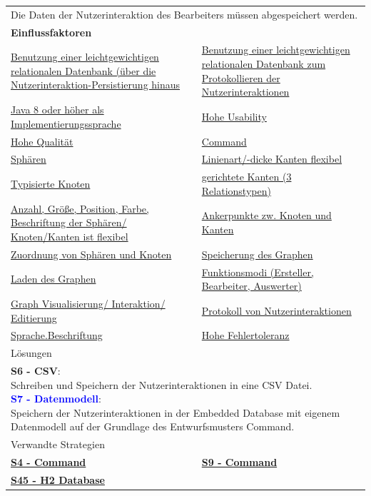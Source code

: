 \documentclass[enabledeprecatedfontcommands,fontsize=11pt,paper=a4,twoside]{scrartcl}
\newcounter{one}
\newcommand{\cb}[1]{{\textcolor{blue}{#1}}}
\begin{document}
	\newpage
	\begin{tabular} {|p{8cm} p{8cm}|}
		\hline
		\rowcolor{prob}\multicolumn{2}{|l|}{\parbox{16cm}{\textbf{03: Datensicherung/Persistenz der Nutzerinteraktionen}}} \\  \hline\hline 
		\multicolumn{2}{|l|}{\parbox{16cm}{Die Daten der Nutzerinteraktion des Bearbeiters müssen abgespeichert werden.}}\rule{0pt}{1ex}\\  \hline
		\multicolumn{2}{|l|}{\textbf{Einflussfaktoren}}\\
		\hyperlink {e}{Benutzung einer leichtgewichtigen relationalen Datenbank (über die Nutzerinteraktion-Persistierung hinaus} & 
		\hyperlink {d}{Benutzung einer leichtgewichtigen relationalen Datenbank zum Protokollieren der Nutzerinteraktionen}\\ 
		\hyperlink{b}{Java 8 oder höher als Implementierungssprache} & 
		\hyperlink {g}{Hohe Usability}\\
		\hyperlink {h}{Hohe Qualität} &
		\hyperlink {i}{Command} \\
		\hyperlink {n}{Sphären} &
		\hyperlink {o}{Linienart/-dicke Kanten flexibel} \\
		\hyperlink {p}{Typisierte Knoten} &
		\hyperlink {q}{gerichtete Kanten (3 Relationstypen)} \\
		\hyperlink {r}{Anzahl, Größe, Position, Farbe, Beschriftung der Sphären/ Knoten/Kanten ist flexibel} &
		\hyperlink {s}{Ankerpunkte zw. Knoten und Kanten} \\
		\hyperlink {t}{Zuordnung von Sphären und Knoten} &
		\hyperlink {v}{Speicherung des Graphen} \\
		\hyperlink {w}{Laden des Graphen} &
		\hyperlink {z}{Funktionsmodi (Ersteller, Bearbeiter, Auswerter)} \\
		\hyperlink {aa}{Graph Visualisierung/ Interaktion/ Editierung} &
		\hyperlink {bb}{Protokoll von Nutzerinteraktionen} \\
		\hyperlink {hh}{Sprache.Beschriftung} &
		\hyperlink {tt}{Hohe Fehlertoleranz} 
		\\ \hline
		\multicolumn{2}{|l|}{Lösungen} \\
		\multicolumn{2}{|l|}{\parbox{16cm}{
				\textbf{S6 - CSV}: \\
				Schreiben und Speichern der Nutzerinteraktionen in eine CSV Datei. \\
				\textbf{\cb{\hypertarget{aaa}{S7 - Datenmodell}}}: \\
				Speichern der Nutzerinteraktionen in der Embedded Database mit eigenem Datenmodell auf der Grundlage des Entwurfsmusters Command.}}\\ 
		\hline
		\multicolumn{2}{|l|}{Verwandte Strategien} \\
		\textbf{\hyperlink {zz}{S4 - Command}} &
		\textbf{\hyperlink {command}{S9 - Command}} \\
		\textbf{\hyperlink {ppp}{S45 - H2 Database}}&
		\\\hline
	\end{tabular}\\ \\ \\
\end{document}
